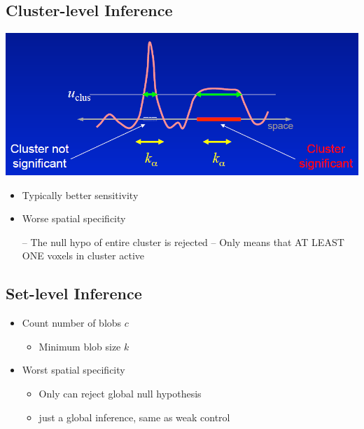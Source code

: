 \documentclass[]{article}
\providecommand{\tightlist}{%
  \setlength{\itemsep}{0pt}\setlength{\parskip}{0pt}}
\begin{document}
\subsection{Cluster-level Inference}\label{cluster-level-inference}

\begin{center}\includegraphics[width=700px]{./figs/cluster_level} \end{center}

\begin{itemize}
\item
  Typically better sensitivity
\item
  Worse spatial specificity

  -- The null hypo of entire cluster is rejected -- Only means that AT
  LEAST ONE voxels in cluster active
\end{itemize}

\subsection{Set-level Inference}\label{set-level-inference}

\begin{itemize}
\tightlist
\item
  Count number of blobs \(c\)

  \begin{itemize}
  \tightlist
  \item
    Minimum blob size \(k\)
  \end{itemize}
\item
  Worst spatial specificity

  \begin{itemize}
  \tightlist
  \item
    Only can reject global null hypothesis
  \item
    just a global inference, same as weak control
  \end{itemize}
\end{itemize}
\end{document}
